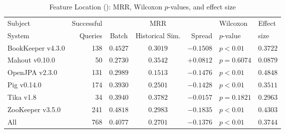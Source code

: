 \begin{table}[t]
\centering
\caption{Feature Location (\ftwo): MRR, Wilcoxon $p$-values, and effect size}
\begin{tabular}{l|r|ccr|ll}
\toprule
Subject & Successful &    & MRR &        & Wilcoxon  & Effect \\
System  & Queries    & Batch & Historical Sim.  & Spread & $p$-value & size \\
\midrule
BookKeeper v4.3.0 & 138 & $\bm{0.4527}$ & $0.3019$ & $-0.1508$ & $p < 0.01$ & $0.3722$ \\
Mahout v0.10.0 & 50 & $0.2730$ & $\bm{0.3542}$ & $+0.0812$ & $p = 0.6074$ & $0.0879$ \\
OpenJPA v2.3.0 & 131 & $\bm{0.2989}$ & $0.1513$ & $-0.1476$ & $p < 0.01$ & $0.4848$ \\
Pig v0.14.0 & 174 & $\bm{0.3930}$ & $0.2501$ & $-0.1428$ & $p < 0.01$ & $0.3511$ \\
Tika v1.8 & 34 & $\bm{0.3940}$ & $0.3782$ & $-0.0157$ & $p = 0.1821$ & $0.2963$ \\
ZooKeeper v3.5.0 & 241 & $\bm{0.4818}$ & $0.2983$ & $-0.1835$ & $p < 0.01$ & $0.4303$ \\
\midrule
All & 768 & $\bm{0.4077}$ & $0.2701$ & $-0.1376$ & $p < 0.01$ & $0.3744$ \\
\bottomrule
\end{tabular}
\label{table:feature_location_rq2}
\end{table}
